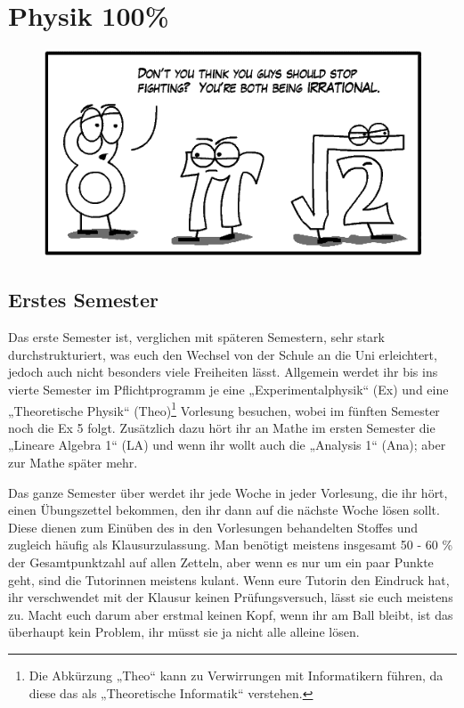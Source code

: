 \section{Physik 100\%}

\begin{figure}[b]
	\centering
	\includegraphics[width=\linewidth]{bilder/both_irrational.png}
\end{figure}

\subsection{Erstes Semester}

Das erste Semester ist, verglichen mit späteren Semestern, sehr stark durchstrukturiert, was euch den Wechsel von der Schule an die Uni erleichtert, jedoch auch nicht besonders viele Freiheiten lässt.  Allgemein werdet ihr bis ins vierte Semester im Pflichtprogramm je eine „Experimentalphysik“ (\gls{Ex}) und eine „Theoretische Physik“ (\gls{Theo})\footnote{Die Abkürzung „Theo“ kann zu Verwirrungen mit Informatikern führen, da diese das als „Theoretische Informatik“ verstehen.} Vorlesung besuchen, wobei im fünften Semester noch die Ex 5 folgt. Zusätzlich dazu hört ihr an Mathe im ersten Semester die „Lineare Algebra 1“ (\gls{LA}) und wenn ihr wollt auch die „Analysis 1“ (\gls{Ana}); aber zur Mathe später mehr.

Das ganze Semester über werdet ihr jede Woche in jeder Vorlesung, die ihr hört, einen Übungszettel bekommen, den ihr dann auf die nächste Woche lösen sollt. Diese dienen zum Einüben des in den Vorlesungen behandelten Stoffes und zugleich häufig als Klausurzulassung. Man benötigt meistens insgesamt 50 - 60 \% der Gesamtpunktzahl auf allen Zetteln, aber wenn es nur um ein paar Punkte geht, sind die Tutorinnen meistens kulant. Wenn eure Tutorin den Eindruck hat, ihr verschwendet mit der Klausur keinen Prüfungsversuch, lässt sie euch meistens zu. Macht euch darum aber erstmal keinen Kopf, wenn ihr am Ball bleibt, ist das überhaupt kein Problem, ihr müsst sie ja nicht alle alleine lösen.

